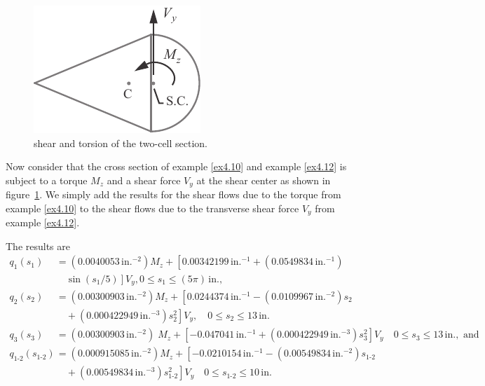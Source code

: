 \documentclass{AeroStructure-ERJohnson}
\begin{document}
\begin{figure}
\includegraphics{Figure_4-42.pdf}
\caption{shear and torsion of the two-cell section.\label{fig4.42}}
\end{figure}

\begin{example*}\label{ex14.13}\setcounter{equation}{0}\def\theequation{\alph{equation}}%
Now consider that the cross section of example \ref{ex4.10} and example \ref{ex4.12} is subject to a torque $M_{z}$ and a shear force $V_{y}$ at the shear center as shown in figure~\ref{fig4.42}. We simply add the results for the shear flows due to the torque from example \ref{ex4.10} to the shear flows due to the transverse shear force $V_{y}$ from example \ref{ex4.12}.

The results are
\begin{align*}
q_{1}(s_{1})&=(0.0040053\,\textrm{in}.^{-2}) M_{z}+\left[0.00342199\,\textrm{in}.^{-1}+(0.0549834\,\textrm{in}.^{-1})\right.\\[4pt]
&\quad \left.\sin (s_{1}/5)\right] V_{y}, 0 \leq s_{1} \leq(5 \pi)\,\textrm{in}.,\\[4pt]
q_{2}(s_{2})&=(0.00300903\,\textrm{in}.^{-2}) M_{z}+\left[0.0244374\,\textrm{in}.^{-1}-(0.0109967\,\textrm{in}.^{-2}) s_{2}\right.\\[4pt]
&\quad +\left.(0.000422949\,\textrm{in}.^{-3}) s_{2}^{2}\right] V_{y},\quad 0 \leq s_{2} \leq 13\,\textrm{in}.\\[4pt]
q_{3}(s_{3})&=(0.00300903\,\textrm{in}.^{-2})\; M_{z}+\left[-0.047041\,\textrm{in}.^{-1}+(0.000422949\,\textrm{in}.^{-3}) s_{3}^{2}\right] V_{y} \quad 0 \leq s_{3} \leq 13\,\textrm{in}., \text{ and}\\[4pt]
q_{\textrm{1-2}}(s_{\textrm{1-2}})&=(0.000915085\,\textrm{in}.^{-2}) M_{z}+\left[-0.0210154\,\textrm{in}.^{-1}-(0.00549834\,\textrm{in}.^{-2}) s_{\textrm{1-2}}\right.\\[4pt]
&\quad +\left.(0.00549834\,\textrm{in}.^{-3}) s_{\textrm{1-2}}^{2}\right] V_{y}\quad 0 \leq s_{\textrm{1-2}} \leq 10\,\textrm{in}.
\end{align*}
\end{example*}
\end{document}
